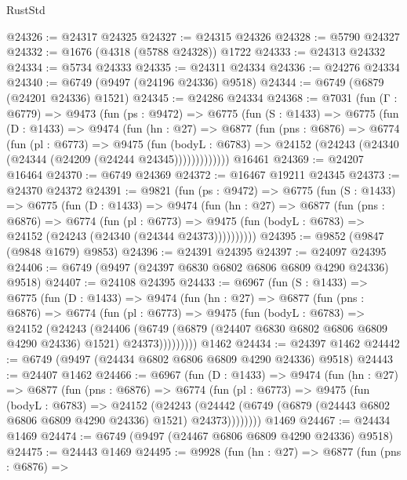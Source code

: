 \begin{lexlean}{RustStd}
\begin{coremodule}
@24326 := @24317 @24325
@24327 := @24315 @24326
@24328 := @5790 @24327
@24332 := @1676 (@4318 (@5788 @24328)) @1722
@24333 := @24313 @24332
@24334 := @5734 @24333
@24335 := @24311 @24334
@24336 := @24276 @24334
@24340 := @6749 (@9497 (@24196 @24336) @9518)
@24344 := @6749 (@6879 (@24201 @24336) @1521)
@24345 := @24286 @24334
@24368 := @7031
    (fun (Γ : @6779) =>
    @9473
      (fun (ps : @9472) =>
      @6775
        (fun (S : @1433) =>
        @6775
          (fun (D : @1433) =>
          @9474
            (fun (hn : @27) =>
            @6877
              (fun (pns : @6876) =>
              @6774
                (fun (pl : @6773) =>
                @9475
                  (fun (bodyL : @6783) =>
                  @24152 (@24243 (@24340 (@24344 (@24209 (@24244 @24345)))))))))))))
    @16461
@24369 := @24207 @16464
@24370 := @6749 @24369
@24372 := @16467 @19211 @24345
@24373 := @24370 @24372
@24391 := @9821
    (fun (ps : @9472) =>
    @6775
      (fun (S : @1433) =>
      @6775
        (fun (D : @1433) =>
        @9474
          (fun (hn : @27) =>
          @6877
            (fun (pns : @6876) =>
            @6774
              (fun (pl : @6773) =>
              @9475 (fun (bodyL : @6783) => @24152 (@24243 (@24340 (@24344 @24373))))))))))
@24395 := @9852 (@9847 (@9848 @1679) @9853)
@24396 := @24391 @24395
@24397 := @24097 @24395
@24406 := @6749 (@9497 (@24397 @6830 @6802 @6806 @6809 @4290 @24336) @9518)
@24407 := @24108 @24395
@24433 := @6967
    (fun (S : @1433) =>
    @6775
      (fun (D : @1433) =>
      @9474
        (fun (hn : @27) =>
        @6877
          (fun (pns : @6876) =>
          @6774
            (fun (pl : @6773) =>
            @9475
              (fun (bodyL : @6783) =>
              @24152
                (@24243
                  (@24406
                    (@6749
                      (@6879 (@24407 @6830 @6802 @6806 @6809 @4290 @24336) @1521)
                      @24373)))))))))
    @1462
@24434 := @24397 @1462
@24442 := @6749 (@9497 (@24434 @6802 @6806 @6809 @4290 @24336) @9518)
@24443 := @24407 @1462
@24466 := @6967
    (fun (D : @1433) =>
    @9474
      (fun (hn : @27) =>
      @6877
        (fun (pns : @6876) =>
        @6774
          (fun (pl : @6773) =>
          @9475
            (fun (bodyL : @6783) =>
            @24152
              (@24243
                (@24442 (@6749 (@6879 (@24443 @6802 @6806 @6809 @4290 @24336) @1521) @24373))))))))
    @1469
@24467 := @24434 @1469
@24474 := @6749 (@9497 (@24467 @6806 @6809 @4290 @24336) @9518)
@24475 := @24443 @1469
@24495 := @9928
    (fun (hn : @27) =>
    @6877
      (fun (pns : @6876) =>

\end{coremodule}
\end{lexlean}

